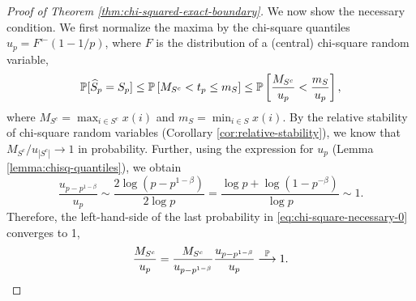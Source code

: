 \begin{proof}[Proof of Theorem \ref{thm:chi-squared-exact-boundary}]
We now show the necessary condition. 
We first normalize the maxima by the chi-square quantiles $u_p = F^{\leftarrow}(1-1/p)$, where $F$ is the distribution of a (central) chi-square random variable,
\begin{equation} \label{eq:chi-square-necessary-0}
 \P[\widehat{S}_p = S_p] \le \P\left[M_{S^c} <  t_p \le m_{S} \right]
  \le \P\left[ \frac{M_{S^c}}{u_p} < \frac{m_S}{u_p} \right],
\end{equation}
where $M_{S^c} = \max_{i\in S^c}x(i)$ and $m_{S} = \min_{i\in S}x(i)$.
By the relative stability of chi-square random variables (Corollary \ref{cor:relative-stability}), we know that ${M_{S^c}}/{u_{|S^c|}}\to1$ in probability. 
Further, using the expression for $u_p$ (Lemma \ref{lemma:chisq-quantiles}), we obtain
$$
\frac{u_{p-p^{1-\beta}}}{u_{p}} \sim \frac{2\log{(p-p^{1-\beta})}}{2\log{p}} = \frac{\log{p}+\log{(1-p^{-\beta})}}{\log{p}} \sim 1.
$$
Therefore, the left-hand-side of the last probability in \eqref{eq:chi-square-necessary-0} converges to 1,
\begin{equation} \label{eq:chi-square-necessary-1}
    \frac{M_{S^c}}{u_{p}} = \frac{M_{S^c}}{u_{p-p^{1-\beta}}} \frac{u_{p-p^{1-\beta}}}{u_{p}} \stackrel{\P}{\longrightarrow} 1.
\end{equation}


\end{proof}
